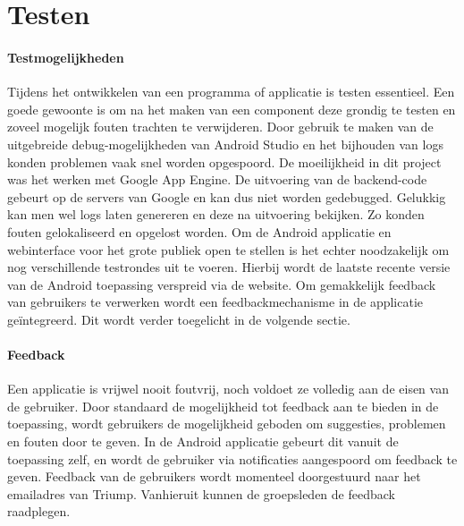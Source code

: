 \chapter{Testen}%
\subsubsection{Testmogelijkheden}
Tijdens het ontwikkelen van een programma of applicatie is testen essentieel. Een goede gewoonte is om na het maken van een component deze grondig te testen en zoveel mogelijk fouten trachten te verwijderen.
Door gebruik te maken van de uitgebreide debug-mogelijkheden van Android Studio en het bijhouden van logs konden problemen vaak snel worden opgespoord. De moeilijkheid in dit project was het werken met Google App Engine. De uitvoering van de backend-code gebeurt op de servers van Google en kan dus niet worden gedebugged. Gelukkig kan men wel logs laten genereren en deze na uitvoering bekijken.
Zo konden fouten gelokaliseerd en opgelost worden.
Om de Android applicatie en webinterface voor het grote publiek open te stellen is het echter noodzakelijk om nog verschillende testrondes uit te voeren. Hierbij wordt de laatste recente versie van de Android toepassing verspreid via de website. Om gemakkelijk feedback van gebruikers te verwerken wordt een feedbackmechanisme in de applicatie geïntegreerd. Dit wordt verder toegelicht in de volgende sectie.

\subsubsection{Feedback}
Een applicatie is vrijwel nooit foutvrij, noch voldoet ze volledig aan de eisen van de gebruiker. Door standaard de mogelijkheid tot feedback aan te bieden in de toepassing, wordt gebruikers de mogelijkheid geboden om suggesties, problemen en fouten door te geven.
In de Android applicatie gebeurt dit vanuit de toepassing zelf, en wordt de gebruiker via notificaties aangespoord om feedback te geven. Feedback van de gebruikers wordt momenteel doorgestuurd naar het emailadres van Triump. Vanhieruit kunnen de groepsleden de feedback raadplegen.

